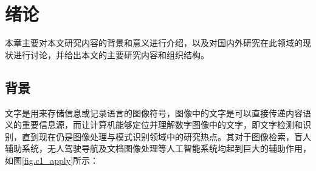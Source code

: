 ﻿%
%
%
%
%
%

\chapter{绪论}

本章主要对本文研究内容的背景和意义进行介绍，以及对国内外研究在此领域的现状进行讨论，并给出本文的主要研究内容和组织结构。

    \section{背景}

    文字是用来存储信息或记录语言的图像符号，图像中的文字是可以直接传递内容语义的重要信息源，而让计算机能够定位并理解数字图像中的文字，即文字检测和识别，直到现在仍是图像处理与模式识别领域中的研究热点。其对于图像检索，盲人辅助系统，无人驾驶导航及文档图像处理等人工智能系统均起到巨大的辅助作用，如图\ref{fig.c1_apply}所示：

